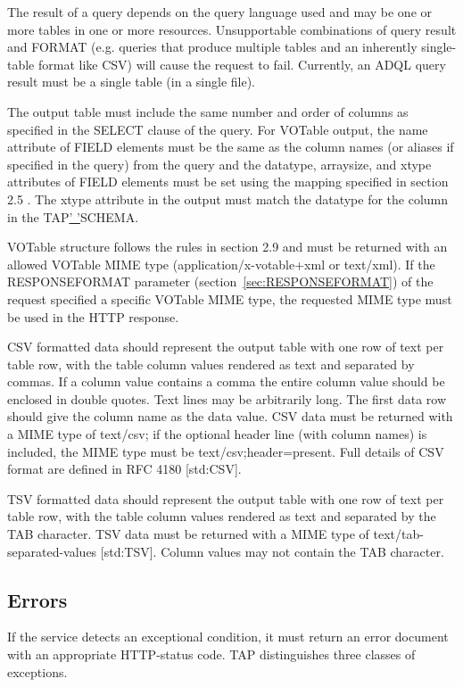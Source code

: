 \documentclass[11pt,letter]{ivoa}
\begin{document}
{The result of a query depends on the query language used and may be one or more 
tables in one or more resources. Unsupportable combinations of query result and 
FORMAT (e.g. queries that produce multiple tables and an inherently 
single-table format like CSV) will cause the request to fail. Currently, an ADQL 
query result must be a single table (in a single file).

The output table must include the same number and order of columns as specified 
in the SELECT clause of the query. For VOTable output, the name attribute of 
FIELD elements must be the same as the column names (or aliases if specified in 
the query) from the query and the datatype, arraysize, and xtype attributes of 
FIELD elements must be set using the mapping specified in section 2.5 . The 
xtype attribute in the output must match the datatype for the column in the 
TAP\underline{' '}SCHEMA.

VOTable structure follows the rules in section 2.9 and must be returned with an 
allowed VOTable MIME type (application/x-votable+xml or text/xml). If the 
RESPONSEFORMAT parameter (section~\ref{sec:RESPONSEFORMAT}) of the request 
specified a specific VOTable MIME type, the requested MIME type must be used 
in the HTTP response.

CSV formatted data should represent the output table with one row of text per 
table row, with the table column values rendered as text and separated by 
commas. If a column value contains a comma the entire column value should be 
enclosed in double quotes.  Text lines may be arbitrarily long.  The first data 
row should give the column name as the data value.   CSV data must be returned 
with a MIME type of text/csv; if the optional header line (with column names) 
is included, the MIME type must be text/csv;header=present. Full details of CSV 
format are defined in RFC 4180 [std:CSV].

TSV formatted data should represent the output table with one row of text per 
table row, with the table column values rendered as text and separated by the 
TAB character. TSV data must be returned with a MIME type of 
text/tab-separated-values [std:TSV]. Column values may not contain the TAB 
character.

\subsection{Errors}
\label{sec:query-error}

If the service detects an exceptional condition, it must return an error 
document with an appropriate HTTP-status code. TAP distinguishes three classes 
of exceptions.

}
\end{document}
